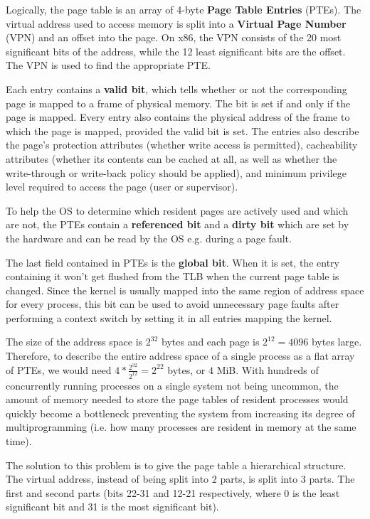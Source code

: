 \documentclass[shortabstract, english]{iithesis}
\begin{document}
Logically, the page table is an array of 4-byte \textbf{Page Table Entries}
(PTEs). The virtual address used to access memory is split into a
\textbf{Virtual Page Number} (VPN) and an offset into the page. On x86, the VPN
consists of the 20 most significant bits of the address, while the 12 least
significant bits are the offset. The VPN is used to find the appropriate PTE.

Each entry contains a \textbf{valid bit}, which tells whether or not the
corresponding page is mapped to a frame of physical memory. The bit is set if
and only if the page is mapped. Every entry also contains the physical address
of the frame to which the page is mapped, provided the valid bit is set. The
entries also describe the page's protection attributes (whether write access is
permitted), cacheability attributes (whether its contents can be cached at all,
as well as whether the write-through or write-back policy should be applied),
and minimum privilege level required to access the page (user or supervisor).

To help the OS to determine which resident pages are actively used and which are
not, the PTEs contain a \textbf{referenced bit} and a \textbf{dirty bit} which
are set by the hardware and can be read by the OS e.g. during a page fault.

The last field contained in PTEs is the \textbf{global bit}. When it is set, the
entry containing it won't get flushed from the TLB when the current page table
is changed. Since the kernel is usually mapped into the same region of address
space for every process, this bit can be used to avoid unnecessary page faults
after performing a context switch by setting it in all entries mapping the
kernel.

The size of the address space is $2^{32}$ bytes and each page is $2^{12} = 4096$
bytes large. Therefore, to describe the entire address space of a single process
as a flat array of PTEs, we would need $4 * \frac{2^{32}}{2^{12}} = 2^{22}$
bytes, or $4$ MiB. With hundreds of concurrently running processes on a single
system not being uncommon, the amount of memory needed to store the page tables
of resident processes would quickly become a bottleneck preventing the system
from increasing its degree of multiprogramming (i.e. how many processes are
resident in memory at the same time).

The solution to this problem is to give the page table a hierarchical structure.
The virtual address, instead of being split into 2 parts, is split into 3 parts.
The first and second parts (bits 22-31 and 12-21 respectively, where 0 is the
least significant bit and 31 is the most significant bit).
\end{document}
